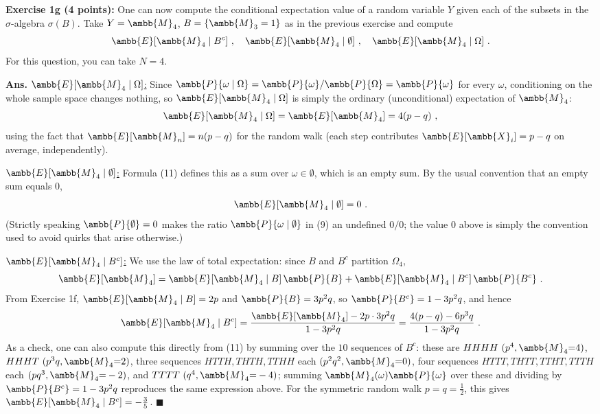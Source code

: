 \documentclass[12pt]{article} %
\newcommand{\mE}{\ambb{E}}
\newcommand{\mX}{\ambb{X}}
\newcommand{\mM}{\ambb{M}}
\newcommand{\mP}{\ambb{P}}
\newcommand{\Ans}{\textbf{Ans. }}
\begin{document}
\textbf{Exercise 1g (4 points):} One can now compute the conditional
expectation value of a random variable $Y$ given each of the subsets in
the $\sigma$-algebra $\sigma(B)$. Take $Y=\mM_4$, $B=\{\mM_3=1\}$ as in
the previous exercise and compute
\begin{equation}
  \mE[\mM_4\mid B^c]\ ,\quad \mE[\mM_4\mid \emptyset]\ ,\quad \mE[\mM_4\mid \Omega]\ .
\end{equation}
For this question, you can take $N=4$.

\Ans \underline{$\mE[\mM_4\mid \Omega]$:} Since $\mP\{\omega\mid
\Omega\} = \mP\{\omega\}/\mP\{\Omega\} = \mP\{\omega\}$ for every
$\omega$, conditioning on the whole sample space changes nothing, so
$\mE[\mM_4\mid\Omega]$ is simply the ordinary (unconditional)
expectation of $\mM_4$:
\begin{equation}
  \mE[\mM_4\mid\Omega] = \mE[\mM_4] = 4(p-q)\ ,
\end{equation}
using the fact that $\mE[\mM_n] = n(p-q)$ for the random walk (each
step contributes $\mE[\mX_i] = p - q$ on average, independently).

\underline{$\mE[\mM_4\mid \emptyset]$:} Formula (11) defines this as a
sum over $\omega \in \emptyset$, which is an empty sum. By the usual
convention that an empty sum equals $0$,
\begin{equation}
  \mE[\mM_4\mid \emptyset] = 0\ .
\end{equation}
(Strictly speaking $\mP\{\emptyset\}=0$ makes the ratio
$\mP\{\omega\mid\emptyset\}$ in (9) an undefined $0/0$; the value $0$
above is simply the convention used to avoid quirks that arise otherwise.)

\underline{$\mE[\mM_4\mid B^c]$:} We use the law of total expectation:
since $B$ and $B^c$ partition $\Omega_4$,
\begin{equation}
  \mE[\mM_4] = \mE[\mM_4\mid B]\,\mP\{B\} + \mE[\mM_4\mid B^c]\,\mP\{B^c\}\ .
\end{equation}
{From} Exercise 1f, $\mE[\mM_4\mid B] = 2p$ and $\mP\{B\}=3p^2q$, so
$\mP\{B^c\} = 1-3p^2q$, and hence
\begin{equation}
  \mE[\mM_4\mid B^c] = \frac{\mE[\mM_4] - 2p\cdot 3p^2q}{1-3p^2q} = \frac{4(p-q) - 6p^3q}{1-3p^2q}\ .
\end{equation}
As a check, one can also compute this directly from (11) by summing
over the $10$ sequences of $B^c$: these are $HHHH\ (p^4,\mM_4{=}4)$,
$HHHT\ (p^3q,\mM_4{=}2)$, three sequences $HTTH,THTH,TTHH$ each
$(p^2q^2,\mM_4{=}0)$, four sequences $HTTT,THTT,TTHT,TTTH$ each
$(pq^3,\mM_4{=}-2)$, and $TTTT\ (q^4,\mM_4{=}-4)$; summing
$\mM_4(\omega)\mP\{\omega\}$ over these and dividing by
$\mP\{B^c\}=1-3p^2q$ reproduces the same expression above. For the
symmetric random walk $p=q=\tfrac12$, this gives
$\mE[\mM_4\mid B^c] = -\tfrac{3}{5}$. \hfill$\blacksquare$
\end{document}
